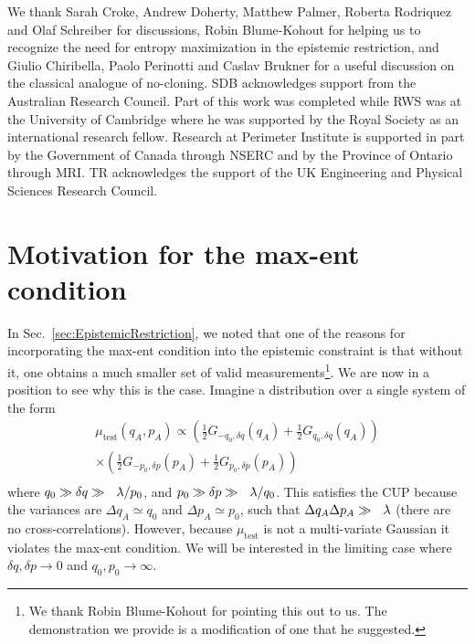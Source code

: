 \documentclass[pra,superscriptaddress,nofootinbib,12pt]{revtex4-2}
\begin{document}
\begin{acknowledgments}
We thank Sarah Croke, Andrew Doherty, Matthew Palmer, Roberta Rodriquez and Olaf Schreiber for discussions, Robin Blume-Kohout for helping us to recognize the need for entropy maximization in the epistemic restriction, and Giulio Chiribella, Paolo Perinotti and Caslav Brukner for a useful discussion on the classical analogue of no-cloning.
SDB acknowledges support from the Australian Research Council.  Part of this work was completed
while RWS was at the University of Cambridge where he was supported by the Royal Society as an international research fellow.  Research at Perimeter Institute is supported in part by the Government of Canada through NSERC and by the Province of Ontario through MRI.  TR acknowledges the support of the UK Engineering and Physical Sciences Research Council.
\end{acknowledgments}


\appendix


\section{Motivation for the max-ent condition}
\label{sec:Whymaxent}

In Sec.~\ref{sec:EpistemicRestriction}, we noted that one of the reasons for incorporating the max-ent condition into the epistemic constraint is that without it, one obtains a much smaller set of valid measurements\footnote{We thank Robin Blume-Kohout for pointing this out to us.  The demonstration we provide is a modification of one that he suggested.}.  We are now in a position to see why this is the case.  Imagine a distribution over a single system of the form
\begin{multline}
\mu_{\textrm{test}}(q_A,p_A) \propto
( \frac{1}{2} G_{-q_0,\delta q} (q_A) +  \frac{1}{2} G_{q_0,\delta q} (q_A))
 \\ \nonumber
\times ( \frac{1}{2} G_{-p_0,\delta p} (p_A) +  \frac{1}{2} G_{p_0,\delta p} (p_A))  \\ \nonumber
\end{multline}
where $q_0 \gg \delta q \gg \lambdabar/p_0$, and $p_0 \gg \delta p \gg \lambdabar/q_0$.  This satisfies the CUP because the variances are $\Delta q_A \simeq q_0$ and $\Delta p_A \simeq p_0$, such that $\Delta q_A \Delta p_A \gg \lambdabar$ (there are no cross-correlations). However, because $\mu_{\textrm{test}}$ is not a multi-variate Gaussian it violates the max-ent condition.  We will be interested in the limiting case where $\delta q, \delta p \to 0$ and $q_0,p_0 \to \infty$.
\end{document}
